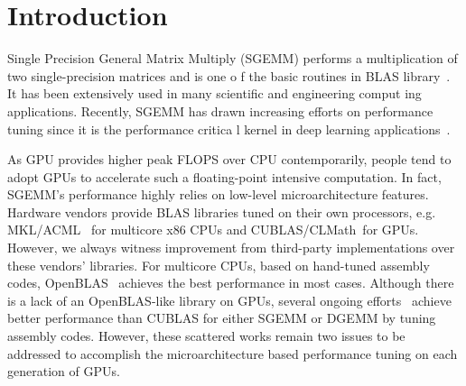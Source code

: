 \section{Introduction}
Single Precision General Matrix Multiply (SGEMM) performs a multiplication of two single-precision matrices and is one o
f the basic routines in BLAS library~\cite{blas}. It has been extensively used in many scientific and engineering comput
ing applications. Recently, SGEMM has drawn increasing efforts on performance tuning since it is the performance critica
l kernel in deep learning applications~\cite{chetlur2014cudnn,nervana_sgemm_wiki}.

As GPU provides higher peak FLOPS over CPU contemporarily, people tend to adopt GPUs to accelerate such a floating-point
 intensive computation. In fact, SGEMM's performance highly relies on low-level microarchitecture features. Hardware
vendors provide BLAS libraries tuned on their own processors, e.g. MKL/ACML~\cite{intel2007intel,amd2014} for multicore 
x86 CPUs and CUBLAS/CLMath~\cite{nvidia2008cublas, clmath}for
GPUs. However, we always witness improvement from third-party implementations over these vendors' libraries. For
multicore CPUs, based on hand-tuned assembly codes, OpenBLAS~\cite{xianyi2012openblas} achieves the best performance in 
most cases.
Although there is a lack of an OpenBLAS-like library on GPUs, several ongoing efforts~\cite{tan,lai,nervana_sgemm_wiki,
chien, volkov} achieve better performance than CUBLAS for either SGEMM or DGEMM by tuning assembly codes. However, these
 scattered works remain two issues to be addressed to accomplish the microarchitecture based performance tuning on each 
generation of GPUs.


